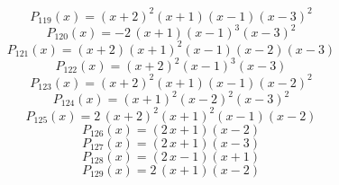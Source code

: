 \subitem \begin{dmath*}P_{119}(x) = {\left(x + 2\right)}^{2} {\left(x + 1\right)} {\left(x - 1\right)} {\left(x - 3\right)}^{2} \end{dmath*}\vspace{-1.2cm}
\subitem \begin{dmath*}P_{120}(x) = -2 \, {\left(x + 1\right)} {\left(x - 1\right)}^{3} {\left(x - 3\right)}^{2} \end{dmath*}\vspace{-1.2cm}
\subitem \begin{dmath*}P_{121}(x) = {\left(x + 2\right)} {\left(x + 1\right)}^{2} {\left(x - 1\right)} {\left(x - 2\right)} {\left(x - 3\right)} \end{dmath*}\vspace{-1.2cm}
\subitem \begin{dmath*}P_{122}(x) = {\left(x + 2\right)}^{2} {\left(x - 1\right)}^{3} {\left(x - 3\right)} \end{dmath*}\vspace{-1.2cm}
\subitem \begin{dmath*}P_{123}(x) = {\left(x + 2\right)}^{2} {\left(x + 1\right)} {\left(x - 1\right)} {\left(x - 2\right)}^{2} \end{dmath*}\vspace{-1.2cm}
\subitem \begin{dmath*}P_{124}(x) = {\left(x + 1\right)}^{2} {\left(x - 2\right)}^{2} {\left(x - 3\right)}^{2} \end{dmath*}\vspace{-1.2cm}
\subitem \begin{dmath*}P_{125}(x) = 2 \, {\left(x + 2\right)}^{2} {\left(x + 1\right)}^{2} {\left(x - 1\right)} {\left(x - 2\right)} \end{dmath*}\vspace{-1.2cm}
\subitem \begin{dmath*}P_{126}(x) = {\left(2 \, x + 1\right)} {\left(x - 2\right)} \end{dmath*}\vspace{-1.2cm}
\subitem \begin{dmath*}P_{127}(x) = {\left(2 \, x + 1\right)} {\left(x - 3\right)} \end{dmath*}\vspace{-1.2cm}
\subitem \begin{dmath*}P_{128}(x) = {\left(2 \, x - 1\right)} {\left(x + 1\right)} \end{dmath*}\vspace{-1.2cm}
\subitem \begin{dmath*}P_{129}(x) = 2 \, {\left(x + 1\right)} {\left(x - 2\right)} \end{dmath*}\vspace{-1.2cm}
